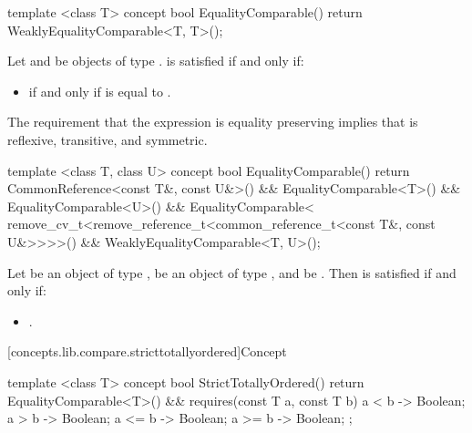 %
\begin{itemdecl}
template <class T>
concept bool EqualityComparable() {
  return WeaklyEqualityComparable<T, T>();
}
\end{itemdecl}

\begin{itemdescr}
\pnum
Let  and  be objects
of type . 
is satisfied if and only if:

\begin{itemize}
\item {} if and only if  is equal to .
\end{itemize}

\pnum
\enternote The requirement that the expression  is equality preserving
implies that \tcode{==} is reflexive, transitive, and symmetric.\exitnote
\end{itemdescr}

%
\begin{itemdecl}
template <class T, class U>
concept bool EqualityComparable() {
  return CommonReference<const T&, const U&>() &&
    EqualityComparable<T>() &&
    EqualityComparable<U>() &&
    EqualityComparable<
      remove_cv_t<remove_reference_t<common_reference_t<const T&, const U&>>>>() &&
    WeaklyEqualityComparable<T, U>();
}
\end{itemdecl}

\begin{itemdescr}
\pnum
Let  be an object of type ,  be an object of type , and  be
.
Then 
is satisfied if and only if:

\begin{itemize}
\item {}.
\end{itemize}
\end{itemdescr}

[concepts.lib.compare.stricttotallyordered]{Concept }

%
\begin{itemdecl}
template <class T>
concept bool StrictTotallyOrdered() {
  return EqualityComparable<T>() &&
    requires(const T a, const T b) {
      { a < b } -> Boolean;
      { a > b } -> Boolean;
      { a <= b } -> Boolean;
      { a >= b } -> Boolean;
    };
}
\end{itemdecl}

